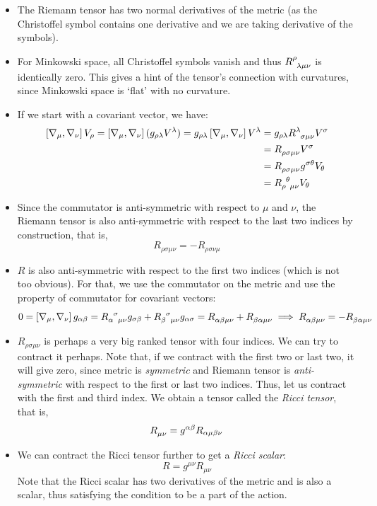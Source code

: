 \begin{itemize}
    \item The Riemann tensor has two normal derivatives of the metric (as the Christoffel symbol contains one derivative and we are taking derivative of the symbols).
    \item For Minkowski space, all Christoffel symbols vanish and thus $\tensor{R}{^\rho _{\lambda\mu\nu}} $ is identically zero. This gives a hint of the tensor's connection with curvatures, since Minkowski space is `flat' with no curvature. 
    \item If we start with a covariant vector, we have:
    \begin{align*}
        \comtr{\covd{\mu}}{\covd{\nu}}V_\rho =\comtr{\covd{\mu}}{\covd{\nu}}( g_{\rho\lambda}V^{\lambda} )= g_{\rho\lambda}\comtr{\covd{\mu}}{\covd{\nu}}V^\lambda &= g_{\rho\lambda}  \tensor{R}{^\lambda _\sigma _\mu _\nu} V^\sigma \\ &= \tensor{R}{_\rho _\sigma _\mu _\nu} V^\sigma \\ &=\tensor{R}{_\rho _\sigma _\mu _\nu} g^{\sigma \theta} V_\theta \\ &=\tensor{R}{_\rho ^\theta _\mu _\nu}  V_\theta
    \end{align*}
    \item Since the commutator is anti-symmetric with respect to $\mu$ and $\nu$, the Riemann tensor is also anti-symmetric with respect to the last two indices by construction, that is,
    $$R_{\rho\sigma\mu\nu} = -R_{\rho\sigma\nu\mu}$$
    \item $R$ is also anti-symmetric with respect to the first two indices (which is not too obvious). For that, we use the commutator on the metric and use the property of commutator for covariant vectors:
    $$0 = \comtr{\covd{\mu}}{\covd{\nu}} g_{\alpha \beta} = \tensor{R}{_\alpha ^\sigma _\mu _\nu}g_{\sigma\beta}  +\tensor{R}{_\beta ^\sigma _\mu _\nu}g_{\alpha\sigma} = \tensor{R}{_\alpha _\beta _\mu _\nu} + \tensor{R}{_\beta _\alpha _\mu _\nu}\implies \tensor{R}{_\alpha _\beta _\mu _\nu} = - \tensor{R}{_\beta _\alpha _\mu _\nu} $$
    \item $R_{\rho\sigma\mu\nu}$ is perhaps a very big ranked tensor with four indices. We can try to contract it perhaps. Note that, if we contract with the first two or last two, it will give zero, since metric is \textit{symmetric} and Riemann tensor is \textit{anti-symmetric} with respect to the first or last two indices. Thus, let us contract with the first and third index. We obtain a tensor called the \textit{Ricci tensor}, that is,
    $$\tensor{R}{_\mu_\nu} = g^{\alpha\beta}R_{\alpha\mu\beta\nu}$$
    \item We can contract the Ricci tensor further to get a \textit{Ricci scalar}:
    $$R =g^{\mu\nu} R_{\mu\nu}$$ 
    Note that the Ricci scalar has two derivatives of the metric and is also a scalar, thus satisfying the condition to be a part of the action. 
\end{itemize}
